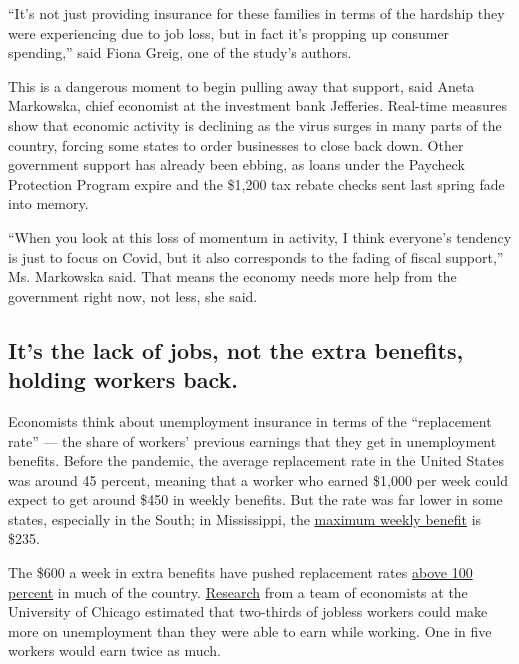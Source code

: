 ``It's not just providing insurance for these families in terms of the
hardship they were experiencing due to job loss, but in fact it's
propping up consumer spending,'' said Fiona Greig, one of the study's
authors.

This is a dangerous moment to begin pulling away that support, said
Aneta Markowska, chief economist at the investment bank Jefferies.
Real-time measures show that economic activity is declining as the virus
surges in many parts of the country, forcing some states to order
businesses to close back down. Other government support has already been
ebbing, as loans under the Paycheck Protection Program expire and the
\$1,200 tax rebate checks sent last spring fade into memory.

``When you look at this loss of momentum in activity, I think everyone's
tendency is just to focus on Covid, but it also corresponds to the
fading of fiscal support,'' Ms. Markowska said. That means the economy
needs more help from the government right now, not less, she said.

\hypertarget{its-the-lack-of-jobs-not-the-extra-benefits-holding-workers-back}{%
\subsection{It's the lack of jobs, not the extra benefits, holding
workers
back.}\label{its-the-lack-of-jobs-not-the-extra-benefits-holding-workers-back}}

Economists think about unemployment insurance in terms of the
``replacement rate'' --- the share of workers' previous earnings that
they get in unemployment benefits. Before the pandemic, the average
replacement rate in the United States was around 45 percent, meaning
that a worker who earned \$1,000 per week could expect to get around
\$450 in weekly benefits. But the rate was far lower in some states,
especially in the South; in Mississippi, the
\href{https://oui.doleta.gov/unemploy/ben_entitle.asp}{maximum weekly
benefit} is \$235.

The \$600 a week in extra benefits have pushed replacement rates
\href{https://www.nytimes3xbfgragh.onion/interactive/2020/04/23/business/economy/unemployment-benefits-stimulus-coronavirus.html}{above
100 percent} in much of the country.
\href{https://www.nber.org/papers/w27216}{Research} from a team of
economists at the University of Chicago estimated that two-thirds of
jobless workers could make more on unemployment than they were able to
earn while working. One in five workers would earn twice as much.


